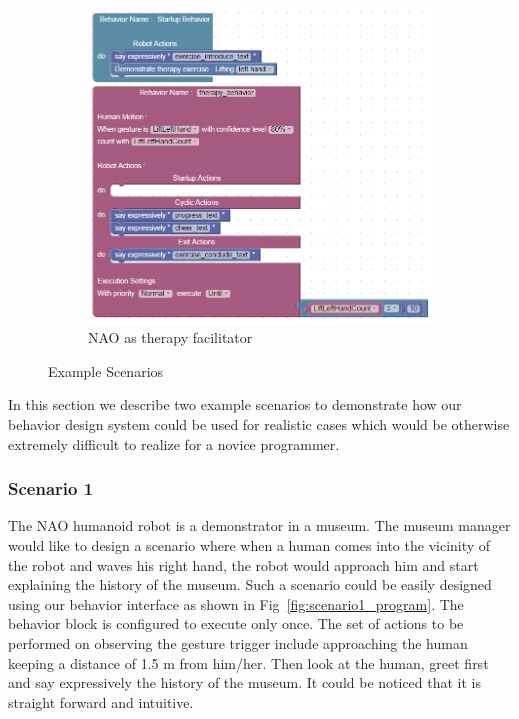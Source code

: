 \documentclass{llncs}
\begin{document}
\begin{figure}
\begin{subfigure}[t]{0.7\textwidth}
\includegraphics[width=\textwidth]{../thesis/assets/scenario2.png}
\caption[NAO as therapy facilitator]{NAO as therapy facilitator}
\label{fig:scenario2_program}
\end{subfigure}
\caption[Example Scenarios]{Example Scenarios}
\label{fig:scenarios}
\end{figure}
In this section we describe two example scenarios to demonstrate how our behavior design system could be used for realistic cases which would be otherwise extremely difficult to realize for a novice programmer.
\subsubsection{Scenario 1}%
The NAO humanoid robot is a demonstrator in a museum. The museum manager would like to design a scenario where when a human comes into the vicinity of the robot and waves his right hand, the robot would approach him and start explaining the history of the museum. Such a scenario could be easily designed using our behavior interface as shown in Fig~\ref{fig:scenario1_program}. The behavior block is configured to execute only once. The set of actions to be performed on observing the gesture trigger include approaching the human keeping a distance of 1.5 m from him/her. Then look at the human, greet first and say expressively the  history of the museum. It could be noticed that it is straight forward and intuitive.%
\end{document}
